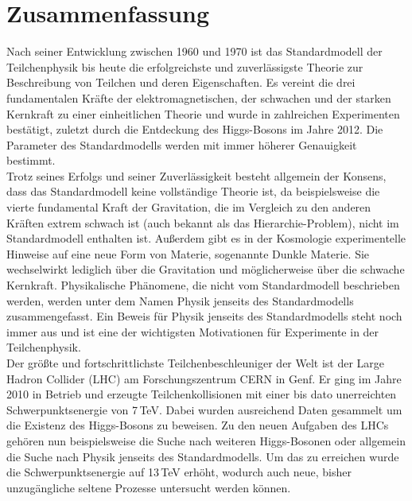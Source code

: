 \chapter*{Zusammenfassung}
Nach seiner Entwicklung zwischen 1960 und 1970 ist das Standardmodell der Teilchenphysik bis heute die erfolgreichste und zuverlässigste Theorie zur Beschreibung von Teilchen und deren Eigenschaften. Es vereint die drei fundamentalen Kräfte der elektromagnetischen, der schwachen und der starken Kernkraft zu einer einheitlichen Theorie und wurde in zahlreichen Experimenten bestätigt, zuletzt durch die Entdeckung des Higgs-Bosons im Jahre 2012. Die Parameter des Standardmodells werden mit immer höherer Genauigkeit bestimmt.\\

Trotz seines Erfolgs und seiner Zuverlässigkeit besteht allgemein der Konsens, dass das Standardmodell keine vollständige Theorie ist, da beispielsweise die vierte fundamental Kraft der Gravitation, die im Vergleich zu den anderen Kräften extrem schwach ist (auch bekannt als das Hierarchie-Problem), nicht im Standardmodell enthalten ist. Außerdem gibt es in der Kosmologie experimentelle Hinweise auf eine neue Form von Materie, sogenannte Dunkle Materie. Sie wechselwirkt lediglich über die Gravitation und möglicherweise über die schwache Kernkraft. Physikalische Phänomene, die nicht vom Standardmodell beschrieben werden, werden unter dem Namen Physik jenseits des Standardmodells zusammengefasst. Ein Beweis für Physik jenseits des Standardmodells steht noch immer aus und ist eine der wichtigsten Motivationen für Experimente in der Teilchenphysik.\\

Der größte und fortschrittlichste Teilchenbeschleuniger der Welt ist der Large Hadron Collider (LHC) am Forschungszentrum CERN in Genf. Er ging im Jahre 2010 in Betrieb und erzeugte Teilchenkollisionen mit einer bis dato unerreichten Schwerpunktsenergie von 7\,TeV. Dabei wurden ausreichend Daten gesammelt um die Existenz des Higgs-Bosons zu beweisen. Zu den neuen Aufgaben des LHCs gehören nun beispielsweise die Suche nach weiteren Higgs-Bosonen oder allgemein die Suche nach Physik jenseits des Standardmodells. Um das zu erreichen wurde die Schwerpunktsenergie auf 13\,TeV erhöht, wodurch auch neue, bisher unzugängliche seltene Prozesse untersucht werden können.\\

